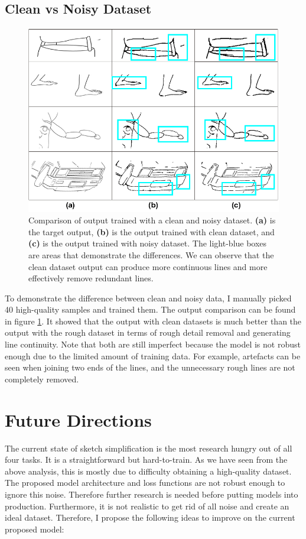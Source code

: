 \subsection{Clean vs Noisy Dataset}
\begin{figure}
    \centering
    \includegraphics[width=1.0\textwidth]{images/sketch/good_vs_bad_dataset.png}
    \caption[Comparison of output trained with a clean and noisy dataset.]{Comparison of output trained with a clean and noisy dataset. \textbf{(a)} is the target output, \textbf{(b)} is the output trained with clean dataset, and \textbf{(c)} is the output trained with noisy dataset. The light-blue boxes are areas that demonstrate the differences. We can observe that the clean dataset output can produce more continuous lines and more effectively remove redundant lines.}
    \label{fig:good_vs_bad_dataset}
\end{figure}
To demonstrate the difference between clean and noisy data, I manually picked 40 high-quality samples and trained them. The output comparison can be found in figure \ref{fig:good_vs_bad_dataset}. It showed that the output with clean datasets is much better than the output with the rough dataset in terms of rough detail removal and generating line continuity. Note that both are still imperfect because the model is not robust enough due to the limited amount of training data. For example, artefacts can be seen when joining two ends of the lines, and the unnecessary rough lines are not completely removed.

\section{Future Directions}
The current state of sketch simplification is the most research hungry out of all four tasks. It is a straightforward but hard-to-train. As we have seen from the above analysis, this is mostly due to difficulty obtaining a high-quality dataset. The proposed model architecture and loss functions are not robust enough to ignore this noise. Therefore further research is needed before putting models into production. Furthermore, it is not realistic to get rid of all noise and create an ideal dataset. Therefore, I propose the following ideas to improve on the current proposed model:

